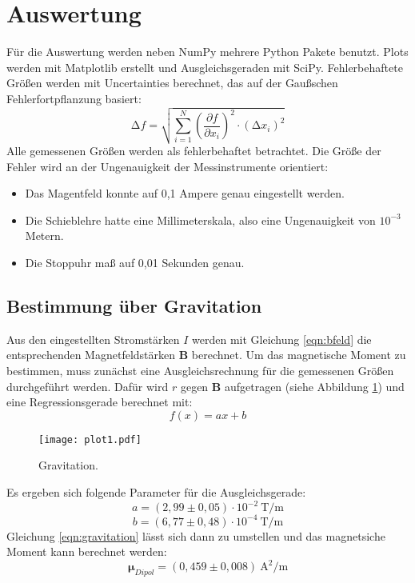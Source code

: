 \section{Auswertung}
\label{sec:Auswertung}

Für die Auswertung werden neben NumPy\cite{numpy} mehrere Python Pakete benutzt.
Plots werden mit Matplotlib\cite{matplotlib} erstellt und Ausgleichsgeraden mit SciPy\cite{scipy}.
Fehlerbehaftete Größen werden mit Uncertainties\cite{uncertainties} berechnet, das auf der Gaußschen Fehlerfortpflanzung basiert:
\begin{equation}
    \increment f = \sqrt{\sum_{i=1}^N \left( \frac{\partial f}{\partial x_i} \right)^{2} \cdot (\increment x_i)^{2}}
\end{equation}
Alle gemessenen Größen werden als fehlerbehaftet betrachtet.
Die Größe der Fehler wird an der Ungenauigkeit der Messinstrumente orientiert:
\begin{itemize}
  \item Das Magentfeld konnte auf 0,1 Ampere genau eingestellt werden.
  \item Die Schieblehre hatte eine Millimeterskala, also eine Ungenauigkeit von $10^{-3}$ Metern.
  \item Die Stoppuhr maß auf 0,01 Sekunden genau.
\end{itemize}

\subsection{Bestimmung über Gravitation}

Aus den eingestellten Stromstärken $I$ werden mit Gleichung \eqref{eqn:bfeld} die entsprechenden Magnetfeldstärken $\symbf{B}$ berechnet.
Um das magnetische Moment zu bestimmen,
muss zunächst eine Ausgleichsrechnung für die gemessenen Größen durchgeführt werden.
Dafür wird $r$ gegen $\symbf{B}$ aufgetragen (siehe Abbildung \ref{fig:plot1}) und eine Regressionsgerade berechnet mit:
\begin{equation}
  f(x) = ax+b
\end{equation}
\begin{figure}
  \centering
  \texttt{[image: plot1.pdf]}
  \caption{Gravitation.}
  \label{fig:plot1}
\end{figure}
Es ergeben sich folgende Parameter für die Ausgleichsgerade:
\begin{equation*}
  a = (2,99 \pm 0,05) \cdot 10^{-2} \: \text{T/m}
\end{equation*}
\begin{equation*}
  b = (6,77 \pm 0,48) \cdot 10^{-4} \: \text{T/m}
\end{equation*}
Gleichung \eqref{eqn:gravitation} lässt sich dann zu umstellen und das magnetsiche Moment kann berechnet werden:
\begin{equation*}
  \symbf{\mu}_{Dipol} = (0,459 \pm 0,008) \: \text{A}^{2}/\text{m}
\end{equation*}

